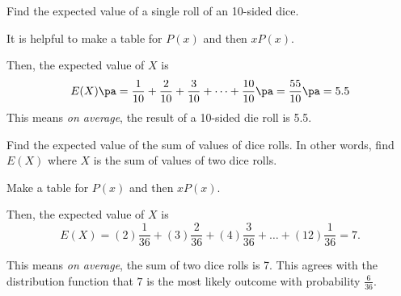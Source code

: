 \begin{frame}[t]
\begin{ex}
Find the expected value of a single roll of an 10-sided dice.
\end{ex}
\begin{sol}
It is helpful to make a table for $P(x)$ and then $x P(x)$.
\begin{table}[]
\end{table}

Then, the expected value of $X$ is 
\[E(X) \pa= \frac{1}{10} + \frac{2}{10} + \frac{3}{10} + \cdots + \frac{10}{10} \pa = \frac{55}{10} \pa = 5.5\]
This means \textit{on average}, the result of a 10-sided die roll is 5.5.
\end{sol}
\end{frame}


\begin{frame}[t]
\begin{ex}
Find the expected value of the sum of values of  dice rolls. In other words, find $E(X)$ where $X$ is the sum of values of two dice rolls.
\end{ex}
\begin{sol}
Make a table for $P(x)$ and then $xP(x)$.
\begin{table}[h!]
\end{table}
Then, the expected value of $X$ is 
\[E(X) = (2)\frac{1}{36} + (3)\frac{2}{36} + (4)\frac{3}{36} + \ldots + (12)\frac{1}{36} = 7.\]

This means \textit{on average}, the sum of two dice rolls is 7. This agrees with the distribution function that $7$ is the most likely outcome  with probability $\frac{6}{36}$.
\end{sol}
\end{frame}


